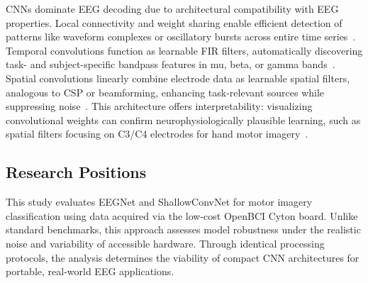 CNNs dominate EEG decoding due to architectural compatibility with EEG properties. Local connectivity and weight sharing enable efficient detection of patterns like waveform complexes or oscillatory bursts across entire time series~\cite{Zhang2021EEG-inception:}. Temporal convolutions function as learnable FIR filters, automatically discovering task- and subject-specific bandpass features in mu, beta, or gamma bands~\cite{2017LearningDR,Wu2025Learning-based,Fukumori2020Epileptic}. Spatial convolutions linearly combine electrode data as learnable spatial filters, analogous to CSP or beamforming, enhancing task-relevant sources while suppressing noise~\cite{Borra2020Interpretable}. This architecture offers interpretability: visualizing convolutional weights can confirm neurophysiologically plausible learning, such as spatial filters focusing on C3/C4 electrodes for hand motor imagery~\cite{lawhern2018eegnet}.

\subsection{Research Positions}
This study evaluates EEGNet and ShallowConvNet for motor imagery classification using data acquired via the low-cost OpenBCI Cyton board. Unlike standard benchmarks, this approach assesses model robustness under the realistic noise and variability of accessible hardware. Through identical processing protocols, the analysis determines the viability of compact CNN architectures for portable, real-world EEG applications.
